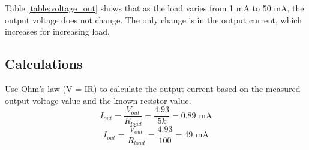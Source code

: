 \documentclass[12pt,letterpaper]{report}
\begin{document}
Table \ref{table:voltage_out} shows that as the load varies from 1 mA to 50 mA, the output voltage does not change. The only change is in the output current, which increases for increasing load.

\subsection*{Calculations}

Use Ohm's law (V = IR) to calculate the output current based on the measured output voltage value and the known resistor value.
$$
I_{out} = \frac{V_{out}}{R_{load}} = \frac{4.93}{5k} = 0.89\text{ mA}
$$
$$
I_{out} = \frac{V_{out}}{R_{load}} = \frac{4.93}{100} = 49\text{ mA}
$$
\end{document}
